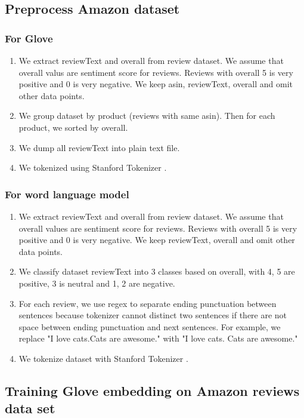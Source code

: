 \subsection{Preprocess Amazon dataset}
\subsubsection{For Glove}\label{sec:preprocessamazonglove}

\begin{enumerate}
	\item We extract reviewText and overall from review dataset. We assume that overall valus are sentiment score for reviews. Reviews with overall 5 is very positive and 0 is very negative. We keep asin, reviewText, overall and omit other data points.
	\item We group dataset by product (reviews with same asin). Then for each product, we sorted by overall.
	\item We dump all reviewText into plain text file.
	\item We tokenized using Stanford Tokenizer \cite{tokenizerpart}.
\end{enumerate}

\subsubsection{For word language model}
\begin{enumerate}
	\item We extract reviewText and overall from review dataset. We assume that overall values are sentiment score for reviews. Reviews with overall 5 is very positive and 0 is very negative. We keep reviewText, overall and omit other data points.
	\item We classify dataset reviewText into 3 classes based on overall, with 4, 5 are positive, 3 is neutral and 1, 2 are negative.
	\item For each review, we use regex to separate ending punctuation between sentences because tokenizer cannot distinct two sentences if there are not space between ending punctuation and next sentences. For example, we replace "I love cats.Cats are awesome." with "I love cats. Cats are awesome." 
	\item We tokenize dataset with Stanford Tokenizer \cite{tokenizerpart}.
\end{enumerate}

\subsection{Training Glove embedding on Amazon reviews data set}\label{sec:gloveamazone}

